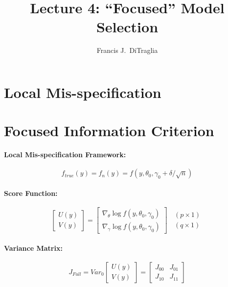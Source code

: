 \documentclass[12pt]{article}
\theoremstyle{definition}
\begin{document}
\title{Lecture 4: ``Focused'' Model Selection}

\author{Francis J.\ DiTraglia}

\maketitle 

\section{Local Mis-specification}

\section{Focused Information Criterion}


\paragraph{Local Mis-specification Framework:}
	$$f_{true}(y)=f_n(y)=f(y, \theta_0, \gamma_0 + \delta/\sqrt{n})$$

\paragraph{Score Function:}
	$$\left[\begin{array}{c}
		U(y)\\
		V(y)
\end{array} \right] = \left[\begin{array}{c}
		\nabla_\theta \log{f(y, \theta_0, \gamma_0)}\\
		\nabla_\gamma \log{f(y, \theta_0, \gamma_0)}
\end{array}\right]\;\;\begin{array}{c}
		(p\times 1)\\
		(q\times 1)
\end{array}$$

\paragraph{Variance Matrix:}
	$$J_{Full} = Var_0\left[\begin{array}{c}
		U(y)\\
		V(y)
\end{array}\right]=\left[\begin{array}{cc}
		J_{00} & J_{01}\\
		J_{10} & J_{11}
	\end{array}\right]
$$
\end{document}
